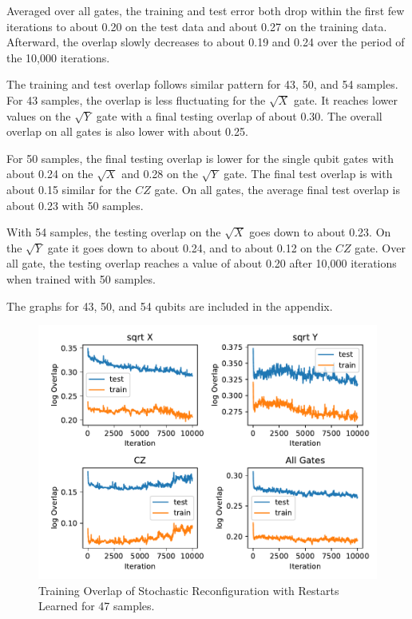Averaged over all gates, the training and test error both drop within the first few iterations to about 
0.20 on the test data and about 0.27 on the training data. Afterward, the overlap slowly decreases to about 0.19 and 
0.24 over the period of the 10,000 iterations.

The training and test overlap follows similar pattern for 43, 50, and 54 samples. For 43 samples, the 
overlap is less fluctuating for the $\sqrt{X}$ gate. It reaches lower values on the $\sqrt{Y}$ gate with 
a final testing overlap of about 0.30. The overall overlap on all gates is also lower with about 0.25.

For 50 samples, the final testing overlap is lower for the single qubit gates with about 0.24 on the $\sqrt{X}$
and 0.28 on the $\sqrt{Y}$ gate. The final test overlap is with about 0.15 similar for the $CZ$ gate. On all gates, 
the average final test overlap is about 0.23 with 50 samples.

With 54 samples, the testing overlap on the $\sqrt{X}$ goes down to about 0.23. On the $\sqrt{Y}$ gate it goes 
down to about 0.24, and to about 0.12 on the $CZ$ gate. Over all gate, the testing overlap reaches a value of about 
0.20 after 10,000 iterations when trained with 50 samples.

The graphs for 43, 50, and 54 qubits are included in the appendix.

\begin{figure}[H]
  \centering
  \includegraphics[width=\textwidth]{figures/results/SR-restarts-learned/avgOverlap_47.pdf}
  \caption[Training Overlap of Stochastic Reconfiguration with Restarts Learned]{Training 
  Overlap of Stochastic Reconfiguration with Restarts Learned for 47 samples.}
  \label{fig:sr_overlap_47}
\end{figure}

